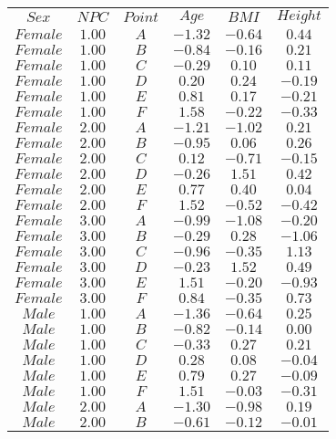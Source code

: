 \begin{tabular}{cccccc}
$Sex$ & $NPC$ & $Point$ & $Age$ & $BMI$ & $Height$\\
$Female$ & $1.00$ & $A$ & $-1.32$ & $-0.64$ & $0.44$\\
$Female$ & $1.00$ & $B$ & $-0.84$ & $-0.16$ & $0.21$\\
$Female$ & $1.00$ & $C$ & $-0.29$ & $0.10$ & $0.11$\\
$Female$ & $1.00$ & $D$ & $0.20$ & $0.24$ & $-0.19$\\
$Female$ & $1.00$ & $E$ & $0.81$ & $0.17$ & $-0.21$\\
$Female$ & $1.00$ & $F$ & $1.58$ & $-0.22$ & $-0.33$\\
$Female$ & $2.00$ & $A$ & $-1.21$ & $-1.02$ & $0.21$\\
$Female$ & $2.00$ & $B$ & $-0.95$ & $0.06$ & $0.26$\\
$Female$ & $2.00$ & $C$ & $0.12$ & $-0.71$ & $-0.15$\\
$Female$ & $2.00$ & $D$ & $-0.26$ & $1.51$ & $0.42$\\
$Female$ & $2.00$ & $E$ & $0.77$ & $0.40$ & $0.04$\\
$Female$ & $2.00$ & $F$ & $1.52$ & $-0.52$ & $-0.42$\\
$Female$ & $3.00$ & $A$ & $-0.99$ & $-1.08$ & $-0.20$\\
$Female$ & $3.00$ & $B$ & $-0.29$ & $0.28$ & $-1.06$\\
$Female$ & $3.00$ & $C$ & $-0.96$ & $-0.35$ & $1.13$\\
$Female$ & $3.00$ & $D$ & $-0.23$ & $1.52$ & $0.49$\\
$Female$ & $3.00$ & $E$ & $1.51$ & $-0.20$ & $-0.93$\\
$Female$ & $3.00$ & $F$ & $0.84$ & $-0.35$ & $0.73$\\
$Male$ & $1.00$ & $A$ & $-1.36$ & $-0.64$ & $0.25$\\
$Male$ & $1.00$ & $B$ & $-0.82$ & $-0.14$ & $0.00$\\
$Male$ & $1.00$ & $C$ & $-0.33$ & $0.27$ & $0.21$\\
$Male$ & $1.00$ & $D$ & $0.28$ & $0.08$ & $-0.04$\\
$Male$ & $1.00$ & $E$ & $0.79$ & $0.27$ & $-0.09$\\
$Male$ & $1.00$ & $F$ & $1.51$ & $-0.03$ & $-0.31$\\
$Male$ & $2.00$ & $A$ & $-1.30$ & $-0.98$ & $0.19$\\
$Male$ & $2.00$ & $B$ & $-0.61$ & $-0.12$ & $-0.01$\\

\end{tabular}
